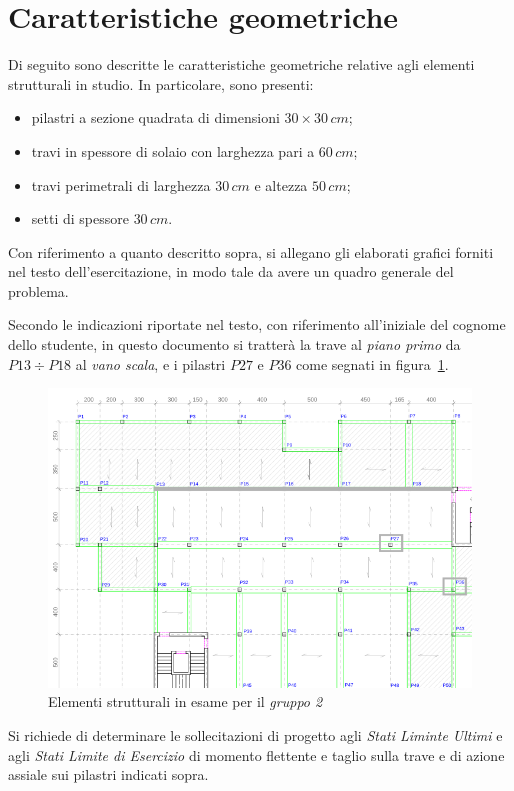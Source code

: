 \section{Caratteristiche geometriche}\label{sec:geomCar}
Di seguito sono descritte le caratteristiche geometriche relative agli elementi strutturali in studio. In particolare, sono presenti:
\begin{itemize}
 \item pilastri a sezione quadrata di dimensioni $30 \times 30\,\si{cm}$;
 \item travi in spessore di solaio con larghezza pari a $60\,\si{cm}$;
 \item travi perimetrali di larghezza $30\,\si{cm}$ e altezza $50\,\si{cm}$;
 \item setti di spessore $30\,\si{cm}$.
\end{itemize}

Con riferimento a quanto descritto sopra, si allegano gli elaborati grafici forniti nel testo dell'esercitazione, in modo tale da avere un quadro generale del problema.
\cleardoublepage





\cleardoublepage
Secondo le indicazioni riportate nel testo, con riferimento all'iniziale del cognome dello studente, in questo documento si tratterà la trave al \emph{piano primo} da $P13 \div P18$ al \emph{vano scala}, e i pilastri $P27$ e $P36$ come segnati in figura~\ref{fig:pianoPrimo}.
\begin{figure}
 \centering
 \includegraphics[width=\textwidth]{../../pianoPrimo_esercitazione.png}
 \caption{Elementi strutturali in esame per il \emph{gruppo 2}}
 \label{fig:pianoPrimo}
\end{figure}

Si richiede di determinare le sollecitazioni di progetto agli \emph{Stati Liminte Ultimi} e agli \emph{Stati Limite di Esercizio} di momento flettente e taglio sulla trave e di azione assiale sui pilastri indicati sopra. 
\cleardoublepage
